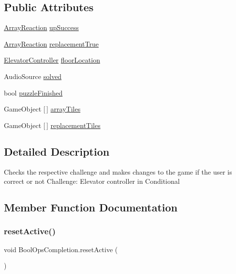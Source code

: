 \subsection*{Public Attributes}
\begin{DoxyCompactItemize}
\item 
\hyperlink{class_array_reaction}{Array\+Reaction} \hyperlink{class_bool_ops_completion_a125b0cee3df92d1129222378c68776de}{up\+Success}
\item 
\hyperlink{class_array_reaction}{Array\+Reaction} \hyperlink{class_bool_ops_completion_a1e2dab96d55c7681be9d553f96fa652f}{replacement\+True}
\item 
\hyperlink{class_elevator_controller}{Elevator\+Controller} \hyperlink{class_bool_ops_completion_a987550dba04494bc4f310799b5f578d6}{floor\+Location}
\item 
Audio\+Source \hyperlink{class_bool_ops_completion_a1d343ac77c80d677ef0872217fcd5dc6}{solved}
\item 
bool \hyperlink{class_bool_ops_completion_a091b63eacef0cfc3a50f79e4a2e98fb2}{puzzle\+Finished}
\item 
Game\+Object \mbox{[}$\,$\mbox{]} \hyperlink{class_bool_ops_completion_a123c64568a207492685649213dd0d25f}{array\+Tiles}
\item 
Game\+Object \mbox{[}$\,$\mbox{]} \hyperlink{class_bool_ops_completion_a5c3233d04c96464e3014aa88e9c2ff37}{replacement\+Tiles}
\end{DoxyCompactItemize}


\subsection{Detailed Description}
Checks the respective challenge and makes changes to the game if the user is correct or not Challenge\+: Elevator controller in Conditional 

\subsection{Member Function Documentation}
\mbox{\label{class_bool_ops_completion_a49619737dd343ae03519ff6db1eeebc2}} 
\subsubsection{\texorpdfstring{reset\+Active()}{resetActive()}}
{\footnotesize\ttfamily void Bool\+Ops\+Completion.\+reset\+Active (\begin{DoxyParamCaption}{ }\end{DoxyParamCaption})}

